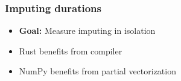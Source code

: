 \documentclass[t,english]{beamer}
\begin{document}
\begin{frame}
  \frametitle{Imputing durations}
  \begin{itemize}
    \item \textbf{Goal:} Measure imputing in isolation
  \end{itemize}
  \begin{itemize}
    \item<3-> Rust benefits from compiler
    \item<4->  NumPy benefits from partial vectorization
  \end{itemize}
\end{frame}
\end{document}
